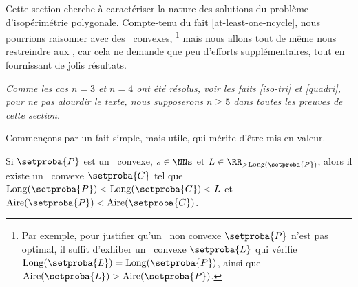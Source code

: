 Cette section cherche à caractériser la nature des solutions du problème d’isopérimétrie polygonale.
Compte-tenu du fait \ref{at-least-one-ncycle}, nous pourrions raisonner avec des \ncycles\ convexes,%
\footnote{
	Par exemple, pour justifier qu'un \ngone\ non convexe $\setproba{P}$ n'est pas optimal, il suffit d'exhiber un \ncycle\ convexe $\setproba{L}$ qui vérifie
$\cyclelen{\setproba{L}} = \cyclelen{\setproba{P}}$,
	ainsi que
	$\area{\setproba{L}} > \area{\setproba{P}}$.
}
mais nous allons tout de même nous restreindre aux \ngones, car cela ne demande que peu d'efforts supplémentaires, tout en fournissant de jolis résultats.

\begin{tcolorbox}
	\itshape\small
	Comme les cas $n = 3$ et $n = 4$ ont été résolus, voir les faits \ref{iso-tri} et \ref{quadri}, pour ne pas alourdir le texte, nous supposerons $n \geq 5$ dans toutes les preuves de cette section.
\end{tcolorbox}




Commençons par un fait simple, mais utile, qui mérite d'être mis en valeur.


\begin{fact} \label{bigger-convex}
    Si $\setproba{P}$ est un \ngone\ convexe, $s \in \NNs$ et $L \in \RR_{>\cyclelen{\setproba{P}}}$,
    alors il existe un \ convexe $\setproba{C}$ tel que
	$\cyclelen{\setproba{P}} < \cyclelen{\setproba{C}} < L$
	et
	$\area{\setproba{P}} < \area{\setproba{C}}$.
\end{fact}


